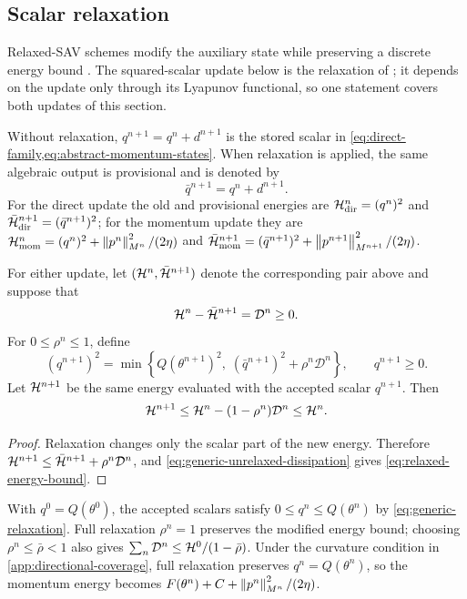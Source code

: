 \subsection{Scalar relaxation}
\label{sec:relaxation-convergence}

Relaxed-SAV schemes modify the auxiliary state while preserving a discrete
energy bound \cite{jiang2022rsav,zhang2022gsavrelax,huang2024optimalrsav}.
The squared-scalar update below is the relaxation of \cite{zhang2026pbsav};
it depends on the update only through its Lyapunov functional, so one
statement covers both updates of this section.

Without relaxation, \(q^{n+1}=q^n+d^{n+1}\) is the stored scalar in
\cref{eq:direct-family,eq:abstract-momentum-states}. When relaxation is
applied, the same algebraic output is provisional and is denoted by
\begin{equation}
  \bar q^{n+1}=q^n+d^{n+1}.
  \label{eq:relaxation-candidate}
\end{equation}
For the direct update the old and provisional energies are
\(\mathcal{H}_{\mathrm{dir}}^n=(q^n)^2\) and
\(\bar{\mathcal{H}}_{\mathrm{dir}}^{n+1}=(\bar q^{n+1})^2\); for the momentum update
they are \(\mathcal{H}_{\mathrm{mom}}^n=(q^n)^2+\left\lVert p^n\right\rVert_{M^n}^2/(2\eta)\) and
\(\bar{\mathcal{H}}_{\mathrm{mom}}^{n+1}=(\bar q^{n+1})^2
+\left\lVert p^{n+1}\right\rVert_{M^{n+1}}^2/(2\eta)\).

\begin{proposition}
\label{prop:generic-relaxation}
For either update, let \((\mathcal{H}^n,\bar{\mathcal{H}}^{n+1})\) denote the corresponding
pair above and suppose that
\begin{equation}
  \mathcal{H}^n-\bar{\mathcal{H}}^{n+1}=\mathcal D^n\geq0.
  \label{eq:generic-unrelaxed-dissipation}
\end{equation}
For \(0\leq\rho^n\leq1\), define
\begin{equation}
  (q^{n+1})^2
  =\min\left\{
  Q(\theta^{n+1})^2,\;
  (\bar q^{n+1})^2+\rho^n\mathcal D^n
  \right\},
  \qquad q^{n+1}\geq0.
  \label{eq:generic-relaxation}
\end{equation}
Let \(\mathcal{H}^{n+1}\) be the same energy evaluated with the accepted
scalar \(q^{n+1}\). Then
\begin{equation}
  \mathcal{H}^{n+1}
  \leq\mathcal{H}^n-(1-\rho^n)\mathcal D^n
  \leq\mathcal{H}^n.
  \label{eq:relaxed-energy-bound}
\end{equation}
\end{proposition}

\begin{proof}
Relaxation changes only the scalar part of the new energy.  Therefore
\(
\mathcal{H}^{n+1}\leq\bar{\mathcal{H}}^{n+1}+\rho^n\mathcal D^n
\), and \cref{eq:generic-unrelaxed-dissipation} gives
\cref{eq:relaxed-energy-bound}.
\end{proof}

With \(q^0=Q(\theta^0)\), the accepted scalars satisfy
\(0\leq q^n\leq Q(\theta^n)\) by \cref{eq:generic-relaxation}.
Full relaxation \(\rho^n=1\) preserves the modified energy bound; choosing
\(\rho^n\leq\bar\rho<1\) also gives
\(\sum_n\mathcal D^n\leq\mathcal{H}^0/(1-\bar\rho)\).
Under the curvature condition in \ref{app:directional-coverage}, full
relaxation preserves \(q^n=Q(\theta^n)\), so the momentum energy becomes
\(F(\theta^n)+C+\left\lVert p^n\right\rVert_{M^n}^2/(2\eta)\).
